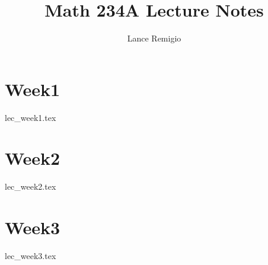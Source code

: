 \documentclass[a4paper]{report}
\title{Math 234A Lecture Notes}
\author{Lance Remigio}
\begin{document}
\maketitle    
\tableofcontents

\chapter{Week1}

{lec_week1.tex}

\chapter{Week2}

{lec_week2.tex}

\chapter{Week3}

{lec_week3.tex}
\end{document}
